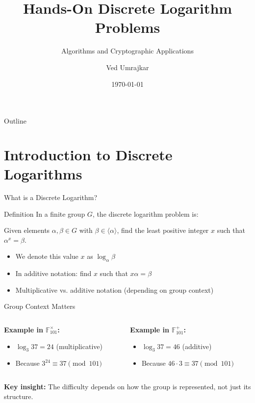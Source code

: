 \documentclass[aspectratio=169]{beamer}
\title[Discrete Logarithm Problem]{Hands-On Discrete Logarithm Problems}
\subtitle{Algorithms and Cryptographic Applications}
\author[]{Ved Umrajkar}
\institute[]{Department of Mathematics\\Indian Institute of Technology, Roorkee}
\date{\today}
\begin{document}
\begin{frame}
  \titlepage
\end{frame}

\begin{frame}{Outline}
  \tableofcontents
\end{frame}

\section{Introduction to Discrete Logarithms}

\begin{frame}{What is a Discrete Logarithm?}
  \begin{block}{Definition}
    In a finite group $G$, the \alert{discrete logarithm problem} is:
    
    Given elements $\alpha, \beta \in G$ with $\beta \in \langle\alpha\rangle$, find the least positive integer $x$ such that $\alpha^x = \beta$.
  \end{block}
  
  \begin{itemize}
    \item We denote this value $x$ as $\log_\alpha \beta$
    \item In additive notation: find $x$ such that $x\alpha = \beta$
    \item Multiplicative vs. additive notation (depending on group context)
  \end{itemize}
\end{frame}

\begin{frame}{Group Context Matters}
  \begin{columns}
    \begin{column}{0.48\textwidth}
      \textbf{Example in $\mathbb{F}_{101}^{\times}$:}
      \begin{itemize}
        \item $\log_3 37 = 24$ (multiplicative)
        \item Because $3^{24} \equiv 37 \pmod{101}$
      \end{itemize}
    \end{column}
    \begin{column}{0.48\textwidth}
      \textbf{Example in $\mathbb{F}_{101}^{+}$:}
      \begin{itemize}
        \item $\log_3 37 = 46$ (additive)
        \item Because $46 \cdot 3 \equiv 37 \pmod{101}$
      \end{itemize}
    \end{column}
  \end{columns}
  \vspace{0.5cm}
  \textbf{Key insight:} The difficulty depends on how the group is represented, not just its structure.
\end{frame}
\end{document}
